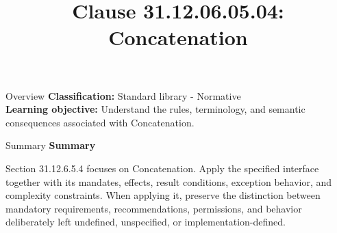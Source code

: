 \documentclass[10pt,letterpaper]{article}
\title{Clause 31.12.06.05.04: Concatenation}
\author{}
\date{}
\begin{document}
\maketitle
\begin{CornellOverviewBox}{Overview}
\textbf{Classification:} Standard library - Normative\\[2pt]
\textbf{Learning objective:} Understand the rules, terminology, and semantic consequences associated with Concatenation.
\end{CornellOverviewBox}\begin{CornellSummaryBox}{Summary}
{\sffamily\bfseries\color{Accent} Summary}\par\vspace{3pt}Section 31.12.6.5.4 focuses on Concatenation. Apply the specified interface together with its mandates, effects, result conditions, exception behavior, and complexity constraints. When applying it, preserve the distinction between mandatory requirements, recommendations, permissions, and behavior deliberately left undefined, unspecified, or implementation-defined.
\end{CornellSummaryBox}
\end{document}
